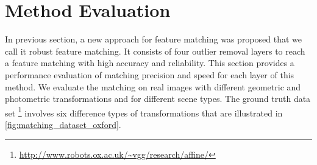

\section {Method Evaluation}
In previous section, a new approach for feature matching was proposed that we call it robust feature matching. It consists of four outlier removal layers to reach a feature matching with high accuracy and reliability. This section provides a performance evaluation of matching precision and speed for each layer of this method. We evaluate the matching on real images with different geometric and photometric transformations and for different scene types. The ground truth data set \footnote {\url{http://www.robots.ox.ac.uk/~vgg/research/affine/}} involves six difference types of transformations that are illustrated in \autoref{fig:matching_dataset_oxford}.

